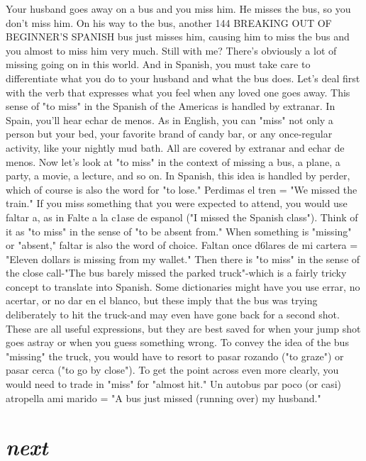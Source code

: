 Your husband goes away on a bus and you miss him. He
misses the bus, so you don't miss him. On his way to the bus, another
144 BREAKING OUT OF BEGINNER'S SPANISH
bus just misses him, causing him to miss the bus and you almost to
miss him very much. Still with me? There's obviously a lot of missing
going on in this world. And in Spanish, you must take care to differentiate what you do to your husband and what the bus does.
Let's deal first with the verb that expresses what you feel
when any loved one goes away. This sense of "to miss" in the Spanish
of the Americas is handled by extranar. In Spain, you'll hear echar de
menos. As in English, you can "miss" not only a person but your bed,
your favorite brand of candy bar, or any once-regular activity, like your
nightly mud bath. All are covered by extranar and echar de menos.
Now let's look at "to miss" in the context of missing a bus,
a plane, a party, a movie, a lecture, and so on. In Spanish, this idea is
handled by perder, which of course is also the word for "to lose." Perdimas el tren = "We missed the train." If you miss something that
you were expected to attend, you would use faltar a, as in Falte a la
c1ase de espanol ("I missed the Spanish class"). Think of it as "to
miss" in the sense of "to be absent from." When something is "missing" or "absent," faltar is also the word of choice. Faltan once d6lares
de mi cartera = "Eleven dollars is missing from my wallet."
Then there is "to miss" in the sense of the close call-"The
bus barely missed the parked truck"-which is a fairly tricky concept
to translate into Spanish. Some dictionaries might have you use errar,
no acertar, or no dar en el blanco, but these imply that the bus was
trying deliberately to hit the truck-and may even have gone back for
a second shot. These are all useful expressions, but they are best saved
for when your jump shot goes astray or when you guess something
wrong. To convey the idea of the bus "missing" the truck, you would
have to resort to pasar rozando ("to graze") or pasar cerca ("to go by
close"). To get the point across even more clearly, you would need to
trade in "miss" for "almost hit." Un autobus par poco (or casi) atropella ami marido = "A bus just missed (running over) my husband."

\section{\emph{next}}

